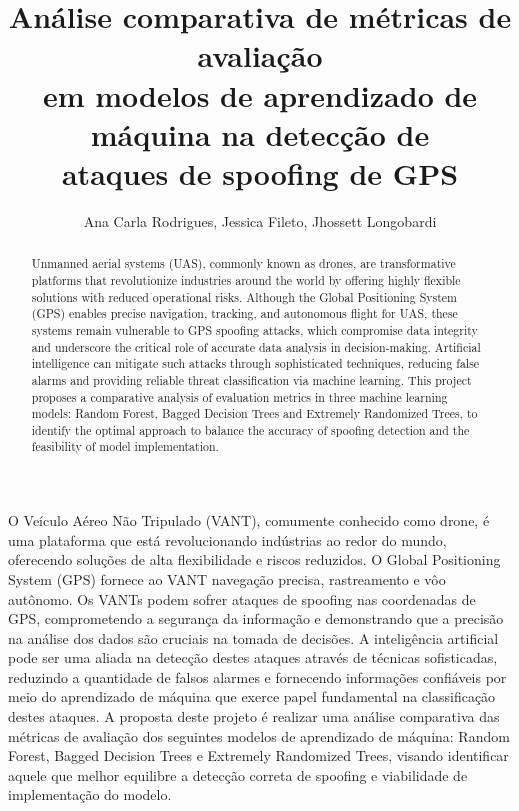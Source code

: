 \documentclass[12pt]{article}
\title{Análise comparativa de métricas de avaliação\\
em modelos de aprendizado de máquina na detecção de\\
ataques de spoofing de GPS
}
\author{Ana Carla Rodrigues\inst{1}, Jessica Fileto\inst{1}, Jhossett Longobardi\inst{1}}
\begin{document}
 

\maketitle

\begin{abstract}
Unmanned aerial systems (UAS), commonly known as drones, are transformative 
platforms that revolutionize industries around the world by offering highly 
flexible solutions with reduced operational risks. Although the Global 
Positioning System (GPS) enables precise navigation, tracking, and autonomous 
flight for UAS, these systems remain vulnerable to GPS spoofing attacks, which 
compromise data integrity and underscore the critical role of accurate data 
analysis in decision-making. Artificial intelligence can mitigate such attacks 
through sophisticated techniques, reducing false alarms and providing reliable 
threat classification via machine learning. This project proposes a comparative 
analysis of evaluation metrics in three machine learning models: Random Forest, 
Bagged Decision Trees and Extremely Randomized Trees, to identify the optimal 
approach to balance the accuracy of spoofing detection and the feasibility of 
model implementation.
\end{abstract}
     
\begin{resumo} 
O Veículo Aéreo Não Tripulado (VANT), comumente conhecido como drone, é uma
plataforma que está revolucionando indústrias ao redor do mundo, oferecendo 
soluções de alta flexibilidade e riscos reduzidos. O Global Positioning System 
(GPS) fornece ao VANT navegação precisa, rastreamento e vôo autônomo. Os VANTs 
podem sofrer ataques de spoofing nas coordenadas de GPS, comprometendo a 
segurança da informação e demonstrando que a precisão na análise dos dados são 
cruciais na tomada de decisões. A inteligência artificial pode ser uma aliada 
na detecção destes ataques através de técnicas sofisticadas, reduzindo a 
quantidade de falsos alarmes e fornecendo informações confiáveis por meio do 
aprendizado de máquina que exerce papel fundamental na classificação destes 
ataques. A proposta deste projeto é realizar uma análise comparativa das 
métricas de avaliação dos seguintes modelos de aprendizado de máquina: Random 
Forest, Bagged Decision Trees e Extremely Randomized Trees, visando identificar 
aquele que melhor equilibre a detecção correta de spoofing e viabilidade de 
implementação do modelo.
\end{resumo}
\end{document}
